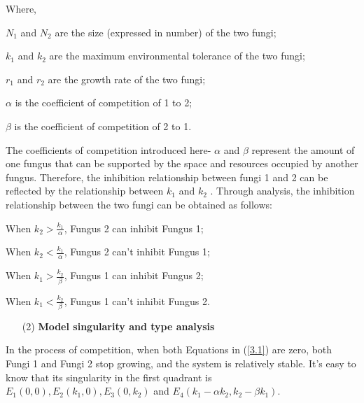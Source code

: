 Where,

$N_{1}$ and $N_{2}$ are the size (expressed in number) of the two fungi;

$k_{1}$ and $k_{2}$ are the maximum environmental tolerance of the two fungi;

$r_{1}$ and $r_{2}$ are the growth rate of the two fungi;

$\alpha$ is the coefficient of competition of 1 to 2;

$\beta$ is the coefficient of competition of 2 to 1.

The coefficients of competition introduced here- $\alpha$ and $\beta$ represent the amount of one fungus that can be supported by the space and resources occupied by another fungus. Therefore, the inhibition relationship between fungi 1 and 2 can be reflected by the relationship between $k_{1}$ and $k_{2}$ . Through analysis, the inhibition relationship between the two fungi can be obtained as follows:

When $k_{2} > \frac{k_{1}}{\alpha}$, Fungus 2 can inhibit Fungus 1;

When $k_{2} < \frac{k_{1}}{\alpha}$, Fungus 2 can’t inhibit Fungus 1;

When $k_{1} > \frac{k_{2}}{\beta}$, Fungus 1 can inhibit Fungus 2;

When $k_{1} < \frac{k_{2}}{\beta}$, Fungus 1 can’t inhibit Fungus 2.
\begin{itemize}
    \item [(2)] 
    \textbf{Model singularity and type analysis}
\end{itemize}

In the process of competition, when both Equations in (\ref{3.1}) are zero, both Fungi 1 and Fungi 2 stop growing, and the system is relatively stable. It's easy to know that its singularity in the first quadrant is $E_{1}(0,0),E_{2}(k_{1},0),E_{3}(0,k_{2})$ and $E_{4}(k_{1}-\alpha k_{2},k_{2}-\beta k_{1})$.

